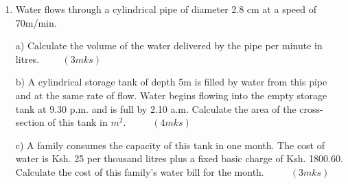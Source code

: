 \documentclass[
  a4paperpaper,
]{scrbook}
\begin{document}
\begin{tcolorbox}
\begin{enumerate}
  (b) Four points A, B, C and D lie on the same plane. Point A is due
  southwest of point B. Point C is 70 Km on a bearing of \(S60^0E\) from
  B. Point D is equidistant from B, Q and C.

  i) Using the Scale: 1 cm represents 10km, construct a diagram showing
  the position of B, C, Q and D. \(\hspace{1cm} (4mks)\)

  ii) Determine the distance between A and B \(\hspace{1cm} (1mk)\)

  iii) Determine the bearing of D from B. \(\hspace{1cm} (1mk)\)
\item
  Water flows through a cylindrical pipe of diameter 2.8 cm at a speed
  of 70m/min.

  a) Calculate the volume of the water delivered by the pipe per minute
  in litres.\(\hspace{1cm} (3mks)\)

  b) A cylindrical storage tank of depth 5m is filled by water from this
  pipe and at the same rate of flow. Water begins flowing into the empty
  storage tank at 9.30 p.m. and is full by 2.10 a.m. Calculate the area
  of the cross-section of this tank in \(m^2\). \(\hspace{1cm} (4mks)\)

  c) A family consumes the capacity of this tank in one month. The cost
  of water is Ksh. 25 per thousand litres plus a fixed basic charge of
  Ksh. 1800.60. Calculate the cost of this family's water bill for the
  month. \(\hspace{1cm} (3mks)\)
\end{enumerate}

\end{tcolorbox}
\end{document}
